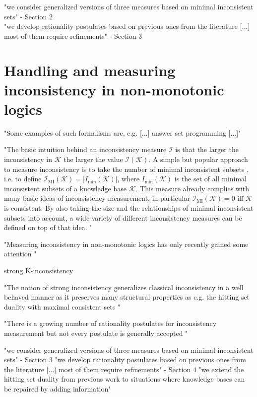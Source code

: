 "we consider generalized versions of three measures based on minimal inconsistent sets" - Section 2\\
"we develop rationality postulates based on previous ones from the literature [...] most of them require refinements" - Section 3

\section{Handling and measuring inconsistency in non-monotonic logics}
\cite{ulbricht_handling_2020}

"Some examples of such formalisms are, e.g. [...] answer set programming \cite{gelfond_logic_2002} [...]"

"The basic intuition behind an inconsistency measure \(\mathcal{I}\) is that the larger the inconsistency in \(\mathcal{K}\) the larger the value \(\mathcal{I}(\mathcal{K})\). A simple but popular approach to measure inconsistency is to take the number of minimal inconsistent subsets \cite{hunter_measuring_2008}, i.e. to define \(\mathcal{I}_{\text{MI}}(\mathcal{K}) = \left| I_{\min}(\mathcal{K}) \right|\), where \(I_{\min}(\mathcal{K})\) is the set of all minimal inconsistent subsets of a knowledge base \(\mathcal{K}\). This measure already complies with many basic ideas of inconsistency measurement, in particular \(\mathcal{I}_{\text{MI}}(\mathcal{K})=0\) iff \(\mathcal{K}\) is consistent. By also taking the size and the relationships of minimal inconsistent subsets into account, a wide variety of different inconsistency measures can be defined on top of that idea. \cite{hunter_measuring_2008} \cite{jabbour_mis_2016}"

"Measuring inconsistency in non-monotonic logics has only recently gained some attention \cite{ulbricht_measuring_2018} \cite{brewka_strong_2019}"

strong K-inconsistency \cite{brewka_strong_2017}

"The notion of strong inconsistency generalizes classical inconsistency in a well behaved manner as it preserves many structural properties as e.g. the hitting set duality with maximal consistent sets \cite{reiter_theory_1987}"

"There is a growing number of rationality postulates for inconsistency measurement but not every postulate is generally accepted \cite{hameurlain_basic_2017} \cite{ferme_revisiting_2014}"

"we consider generalized versions of three measures based on minimal inconsistent sets" - Section 3
"we develop rationality postulates based on previous ones from the literature [...] most of them require refinements" - Section 4
"we extend the hitting set duality from previous work \cite{brewka_strong_2019} to situations where knowledge bases can be repaired by adding information"

